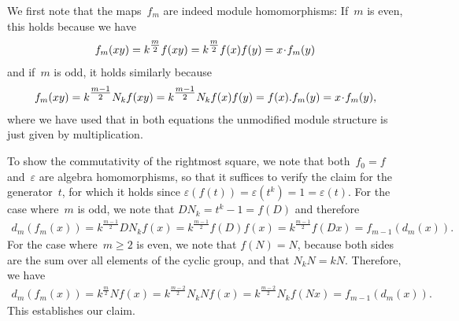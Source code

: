 \documentclass[12pt]{article}
\makeatletter
\theoremstyle{definition}
\theoremstyle{break}
\renewenvironment{proof}[1][\proofname]{\par
\vspace{-5pt}%
\pushQED{\qed}%
\normalfont
\topsep0pt \partopsep0pt %
\trivlist
\item[\hskip\labelsep
\bfseries
#1\@addpunct{.}]\ignorespaces
}{%
\popQED\endtrivlist\@endpefalse
\addvspace{6pt plus 6pt} %
}
\renewcommand{\1}{\mathbbm{1}}
\newcommand{\scdot}{\mathbin{\mspace{-3mu} \cdot \mspace{-3mu}}}
\makeatother
\begin{document}
\begin{proof}
We first note that the maps~$f_m$ are indeed module homomorphisms: If~$m$ is even, this holds because we have
\begin{align*}
f_m(xy) = k^{\tfrac{m}{2}} f(xy) = k^{\tfrac{m}{2}} f(x) f(y) = x \scdot f_m(y)
\end{align*}
and if~$m$ is odd, it holds similarly because
\begin{align*}
f_m(xy) = k^{\tfrac{m-1}{2}} N_k f(xy) = k^{\tfrac{m-1}{2}} N_k f(x) f(y)
= f(x).f_m(y) = x \scdot f_m(y),
\end{align*}
where we have used that in both equations the unmodified module structure is just given by multiplication.

To show the commutativity of the rightmost square, we note that both~$f_0 = f$ and~$\varepsilon$ are algebra homomorphisms, so that it suffices to verify the claim for the generator~$t$, for which it holds since
\mbox{$\varepsilon(f(t)) = \varepsilon(t^k) = 1 = \varepsilon(t)$}.
For the case where~$m$ is odd, we note that $D N_k = t^k - 1 = f(D)$ and therefore
\begin{align*}
d_m(f_m(x)) = k^{\tfrac{m-1}{2}} D N_k f(x) = k^{\tfrac{m-1}{2}} f(D) f(x)
= k^{\tfrac{m-1}{2}} f(Dx) = f_{m-1}(d_m(x)).
\end{align*}
For the case where~$m \geq 2$ is even, we note that $f(N) = N$, because both sides are the sum over all elements of the cyclic group, and that $N_k N = k N$. Therefore, we have
\begin{align*}
d_m(f_m(x)) = k^{\tfrac{m}{2}} N f(x) = k^{\tfrac{m-2}{2}} N_k N f(x)
= k^{\tfrac{m-2}{2}} N_k f(Nx) = f_{m-1}(d_m(x)).
\end{align*}
This establishes our claim.
\end{proof}
\end{document}
